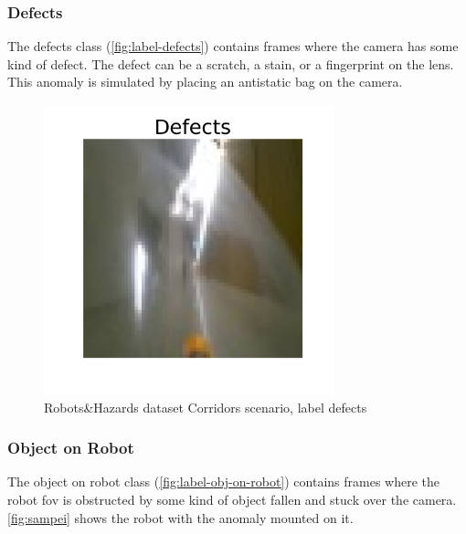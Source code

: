         \subsubsection*{Defects}
            The defects class (\autoref{fig:label-defects}) contains frames where the camera has some kind of defect. The defect can be a scratch, a stain, or a fingerprint on the lens. This anomaly is simulated by placing an antistatic bag on the camera.
            \begin{figure}[H]
                \centering
                \centerline{\includegraphics[width=0.75\textwidth]{img/labels/defects.png}}
                \caption{Robots\&Hazards dataset Corridors scenario, label defects}
                \label{fig:label-defects}
            \end{figure}

        \subsubsection*{Object on Robot}
            The object on robot class (\autoref{fig:label-obj-on-robot}) contains frames where the robot \acrshort{fov} is obstructed by some kind of object fallen and stuck over the camera. \autoref{fig:sampei} shows the robot with the anomaly mounted on it.
            
